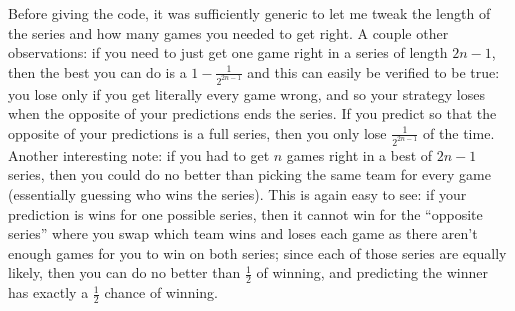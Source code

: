 \documentclass[11pt]{article}
\theoremstyle{definition}
\begin{document}
Before giving the code, it was sufficiently generic to let me tweak the length of the series and how many games you needed to get right.  A couple other observations: if you need to just get one game right in a series of length $2n-1$, then the best you can do is a $1 - \frac{1}{2^{2n-1}}$ and this can easily be verified to be true: you lose only if you get literally every game wrong, and so your strategy loses when the opposite of your predictions ends the series.  If you predict so that the opposite of your predictions is a full series, then you only lose $\frac{1}{2^{2n-1}}$ of the time.  Another interesting note: if you had to get $n$ games right in a best of $2n-1$ series, then you could do no better than picking the same team for every game (essentially guessing who wins the series).  This is again easy to see: if your prediction is wins for one possible series, then it cannot win for the ``opposite series'' where you swap which team wins and loses each game as there aren't enough games for you to win on both series; since each of those series are equally likely, then you can do no better than $\frac{1}{2}$ of winning, and predicting the winner has exactly a $\frac{1}{2}$ chance of winning.
\end{document}
